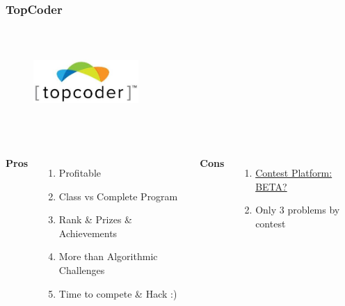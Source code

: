 \documentclass{beamer}
\begin{document}
\begin{frame}
	\frametitle{TopCoder}
	\begin{figure}[t]
		\href{https://arena.topcoder.com/index.html}{\includegraphics[width=4cm,height=4cm,keepaspectratio]{images/judges/topcoder}}
	\end{figure}
	
	\begin{columns}[c] %
		\textbf{Pros}
		\begin{enumerate}
			\item Profitable 
			\item Class vs Complete Program 
			\item Rank \& Prizes \& Achievements
			\item More than Algorithmic Challenges
			\item Time to compete \& Hack :)
		\end{enumerate}
		\textbf{Cons}
		\begin{enumerate}
			\item \href{https://arena.topcoder.com/index.html}{Contest Platform: BETA?}
			\item Only 3 problems by contest
		\end{enumerate}
	\end{columns}

\end{frame}
\end{document}
